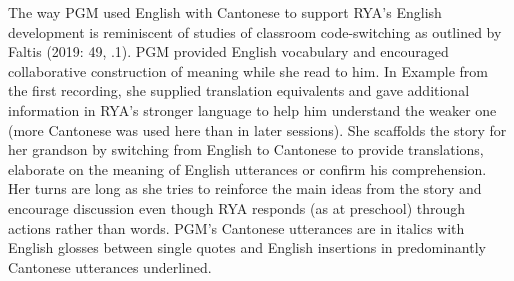 \documentclass[output=paper,colorlinks,citecolor=brown]{langscibook}
\begin{document}
The way PGM used English with Cantonese to support RYA’s English development is reminiscent of studies of classroom code-switching as outlined by Faltis (2019: 49, .1). PGM provided English vocabulary and encouraged collaborative construction of meaning while she read to him. In Example  from the first recording, she supplied translation equivalents and gave additional information in RYA’s stronger language to help him understand the weaker one (more Cantonese was used here than in later sessions). She scaffolds the story for her grandson by switching from English to Cantonese to provide translations, elaborate on the meaning of English utterances or confirm his comprehension. Her turns are long as she tries to reinforce the main ideas from the story and encourage discussion even though RYA responds (as at preschool) through actions rather than words. PGM’s Cantonese utterances are in italics with English glosses between single quotes and English insertions in predominantly Cantonese utterances underlined.
\end{document}
